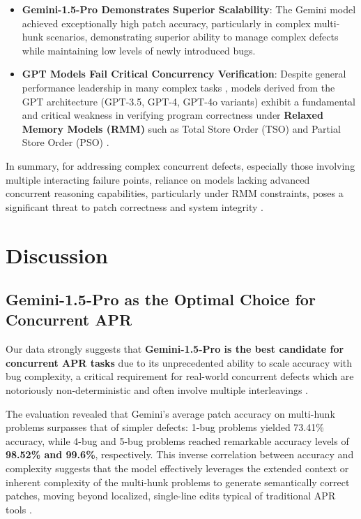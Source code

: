 \begin{itemize}
    \item \textbf{Gemini-1.5-Pro Demonstrates Superior Scalability}: The Gemini model achieved exceptionally high patch accuracy, particularly in complex multi-hunk scenarios, demonstrating superior ability to manage complex defects while maintaining low levels of newly introduced bugs.
    \item \textbf{GPT Models Fail Critical Concurrency Verification}: Despite general performance leadership in many complex tasks \cite{anand2024}, models derived from the GPT architecture (GPT-3.5, GPT-4, GPT-4o variants) exhibit a fundamental and critical weakness in verifying program correctness under \textbf{Relaxed Memory Models (RMM)} such as Total Store Order (TSO) and Partial Store Order (PSO) \cite{anand2024, jain2025}.
\end{itemize}

In summary, for addressing complex concurrent defects, especially those involving multiple interacting failure points, reliance on models lacking advanced concurrent reasoning capabilities, particularly under RMM constraints, poses a significant threat to patch correctness and system integrity \cite{anand2024, jain2025}.

\section{Discussion}

\subsection{Gemini-1.5-Pro as the Optimal Choice for Concurrent APR}

Our data strongly suggests that \textbf{Gemini-1.5-Pro is the best candidate for concurrent APR tasks} due to its unprecedented ability to scale accuracy with bug complexity, a critical requirement for real-world concurrent defects which are notoriously non-deterministic and often involve multiple interleavings \cite{liu2021_2, khoshnood2015}.

The evaluation revealed that Gemini's average patch accuracy on multi-hunk problems surpasses that of simpler defects: 1-bug problems yielded 73.41\% accuracy, while 4-bug and 5-bug problems reached remarkable accuracy levels of \textbf{98.52\% and 99.6\%}, respectively. This inverse correlation between accuracy and complexity suggests that the model effectively leverages the extended context or inherent complexity of the multi-hunk problems to generate semantically correct patches, moving beyond localized, single-line edits typical of traditional APR tools \cite{yang2023}.

